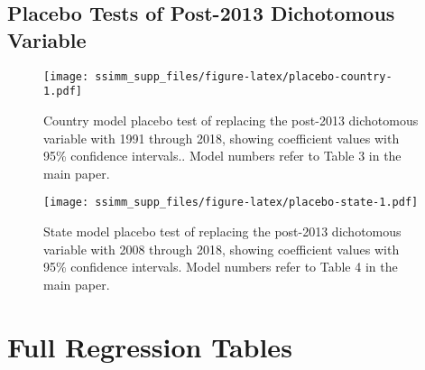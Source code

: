 \documentclass[
  11pt,
]{article}
\begin{document}
\hypertarget{placebo-tests-of-post-2013-dichotomous-variable}{%
\subsection{Placebo Tests of Post-2013 Dichotomous Variable}\label{placebo-tests-of-post-2013-dichotomous-variable}}

\begin{figure}
\centering
\texttt{[image: ssimm\_supp\_files/figure-latex/placebo-country-1.pdf]}
\caption{\label{fig:placebo-country}Country model placebo test of replacing the post-2013 dichotomous variable with 1991 through 2018, showing coefficient values with 95\% confidence intervals.. Model numbers refer to Table 3 in the main paper.}
\end{figure}

\begin{figure}
\centering
\texttt{[image: ssimm\_supp\_files/figure-latex/placebo-state-1.pdf]}
\caption{\label{fig:placebo-state}State model placebo test of replacing the post-2013 dichotomous variable with 2008 through 2018, showing coefficient values with 95\% confidence intervals. Model numbers refer to Table 4 in the main paper.}
\end{figure}

\newpage

\hypertarget{full-regression-tables}{%
\section{Full Regression Tables}\label{full-regression-tables}}
\end{document}
